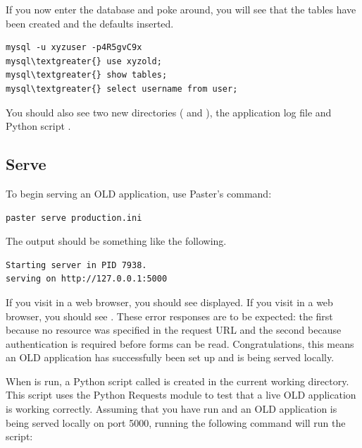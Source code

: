 \documentclass[letterpaper,10pt,english]{sphinxmanual}
\begin{document}
If you now enter the database and poke around, you will see that the tables have
been created and the defaults inserted.

\begin{Verbatim}[commandchars=\\\{\}]
mysql -u xyzuser -p4R5gvC9x
mysql\textgreater{} use xyzold;
mysql\textgreater{} show tables;
mysql\textgreater{} select username from user;
\end{Verbatim}

You should also see two new directories ( and ), the
application log file  and Python script
.


\subsection{Serve}
\label{installation:id2}\label{installation:serve}
To begin serving an OLD application, use Paster's  command:

\begin{Verbatim}[commandchars=\\\{\}]
paster serve production.ini
\end{Verbatim}

The output should be something like the following.

\begin{Verbatim}[commandchars=\\\{\}]
Starting server in PID 7938.
serving on http://127.0.0.1:5000
\end{Verbatim}

If you visit  in a web browser, you should see
 displayed.  If you visit
 in a web browser, you should see
.  These
error responses are to be expected: the first because no resource was specified
in the request URL and the second because authentication is required before
forms can be read.  Congratulations, this means an OLD application has
successfully been set up and is being served locally.

When  is run, a Python script called 
is created in the current working directory.  This script uses the Python
Requests module to test that a live OLD application is working correctly.
Assuming that you have run  and an OLD application is being
served locally on port 5000, running the following command will run the
 script:
\end{document}
